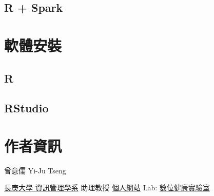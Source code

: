 \documentclass[]{book}
\theoremstyle{definition}
\theoremstyle{definition}
\theoremstyle{remark}
\begin{document}
\section{R + Spark}\label{r-spark}

\chapter{軟體安裝}\label{install}

\section{R}\label{r-2}

\section{RStudio}\label{rstudio}

\chapter*{作者資訊}\label{author}

曾意儒 Yi-Ju Tseng

\href{http://im.cgu.edu.tw/bin/home.php}{長庚大學 資訊管理學系} 助理教授
\href{http://yijutseng.github.io}{個人網站} Lab:
\href{http://yijutseng.github.io/Lab/}{數位健康實驗室}


\end{document}
